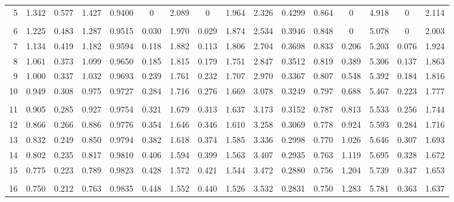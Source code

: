 \begin{center}
{\begin{tabular}{|r|c|c|c|c|c|c|c|c|c|c|c|c|c|c|c|}
	     5 & 1.342 & 0.577 & 1.427 & 0.9400 &   0   & 2.089 &   0   & 1.964
	       & 2.326 & 0.4299 & 0.864 &   0   & 4.918 &   0   & 2.114 \\
	       &       &        &       &       &       &       &       &
	       &       &        &       &       &       &       &       \\
	     6 & 1.225 & 0.483 & 1.287 & 0.9515 & 0.030 & 1.970 & 0.029 & 1.874
	       & 2.534 & 0.3946 & 0.848 &   0   & 5.078 &   0   & 2.003 \\
	     7 & 1.134 & 0.419 & 1.182 & 0.9594 & 0.118 & 1.882 & 0.113 & 1.806
	       & 2.704 & 0.3698 & 0.833 & 0.206 & 5.203 & 0.076 & 1.924 \\
	     8 & 1.061 & 0.373 & 1.099 & 0.9650 & 0.185 & 1.815 & 0.179 & 1.751
	       & 2.847 & 0.3512 & 0.819 & 0.389 & 5.306 & 0.137 & 1.863 \\
	     9 & 1.000 & 0.337 & 1.032 & 0.9693 & 0.239 & 1.761 & 0.232 & 1.707
	       & 2.970 & 0.3367 & 0.807 & 0.548 & 5.392 & 0.184 & 1.816 \\
	    10 & 0.949 & 0.308 & 0.975 & 0.9727 & 0.284 & 1.716 & 0.276 & 1.669
	       & 3.078 & 0.3249 & 0.797 & 0.688 & 5.467 & 0.223 & 1.777 \\
	       &       &        &       &       &       &       &       &
	       &       &        &       &       &       &       &       \\
	    11 & 0.905 & 0.285 & 0.927 & 0.9754 & 0.321 & 1.679 & 0.313 & 1.637
	       & 3.173 & 0.3152 & 0.787 & 0.813 & 5.533 & 0.256 & 1.744 \\
	    12 & 0.866 & 0.266 & 0.886 & 0.9776 & 0.354 & 1.646 & 0.346 & 1.610
	       & 3.258 & 0.3069 & 0.778 & 0.924 & 5.593 & 0.284 & 1.716 \\
	    13 & 0.832 & 0.249 & 0.850 & 0.9794 & 0.382 & 1.618 & 0.374 & 1.585
	       & 3.336 & 0.2998 & 0.770 & 1.026 & 5.646 & 0.307 & 1.693 \\
	    14 & 0.802 & 0.235 & 0.817 & 0.9810 & 0.406 & 1.594 & 0.399 & 1.563
	       & 3.407 & 0.2935 & 0.763 & 1.119 & 5.695 & 0.328 & 1.672 \\
	    15 & 0.775 & 0.223 & 0.789 & 0.9823 & 0.428 & 1.572 & 0.421 & 1.544
	       & 3.472 & 0.2880 & 0.756 & 1.204 & 5.739 & 0.347 & 1.653 \\
	       &       &        &       &       &       &       &       &
	       &       &        &       &       &       &       &       \\
	    16 & 0.750 & 0.212 & 0.763 & 0.9835 & 0.448 & 1.552 & 0.440 & 1.526
	       & 3.532 & 0.2831 & 0.750 & 1.283 & 5.781 & 0.363 & 1.637 \\

\end{tabular}}
\end{center}
